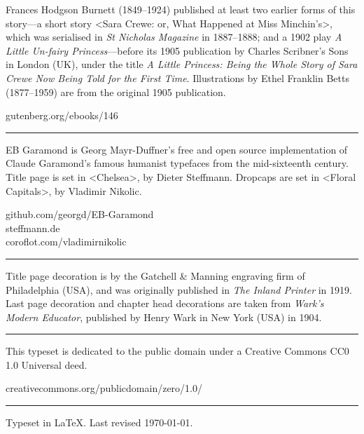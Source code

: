 \documentclass[
paper=5.5in:8.5in,
]{scrbook}
\begin{document}
\centering
\begin{minipage}{\textwidth}
Frances Hodgson Burnett (1849--1924) published at least two earlier forms of this story—a short story <Sara Crewe: or, What Happened at Miss Minchin's>, which was serialised in \textit{St Nicholas Magazine} in 1887--1888; and a 1902 play \textit{A Little Un-fairy Princess}—before its 1905 publication by Charles Scribner's Sons in London (UK), under the title \textit{A Little Princess: Being the Whole Story of Sara Crewe Now Being Told for the First Time}. Illustrations by Ethel Franklin Betts (1877--1959) are from the original 1905 publication.
\end{minipage}
\vfill
gutenberg.org/ebooks/146
\vfill
\rule{0.5\textwidth}{.4pt}
\vfill
\begin{minipage}{\textwidth}
EB Garamond is Georg Mayr-Duffner's free and open source implementation of Claude Garamond’s famous humanist typefaces from the mid-sixteenth century. Title page is set in <Chelsea>, by Dieter Steffmann. Dropcaps are set in <Floral Capitals>, by Vladimir Nikolic.
\end{minipage}
\vfill
github.com/georgd/EB-Garamond\\
steffmann.de\\
coroflot.com/vladimirnikolic
\vfill
\rule{0.5\textwidth}{.4pt}
\vfill
\begin{minipage}{\textwidth}
Title page decoration is by the Gatchell \& Manning engraving firm of Philadelphia (USA), and was originally published in \textit{The Inland Printer} in 1919. Last page decoration and chapter head decorations are taken from \textit{Wark's Modern Educator}, published by Henry Wark in New York (USA) in 1904.
\end{minipage}
\vfill
\rule{0.5\textwidth}{.4pt}
\vfill
\begin{minipage}{\textwidth}
This typeset is dedicated to the public domain under a Creative Commons CC0 1.0 Universal deed.\end{minipage}
\vfill
creativecommons.org/publicdomain/zero/1.0/
\vfill
\rule{0.5\textwidth}{.4pt}
\vfill
Typeset in \LaTeX{}. Last revised \today.
\thispagestyle{empty}
\end{document}
